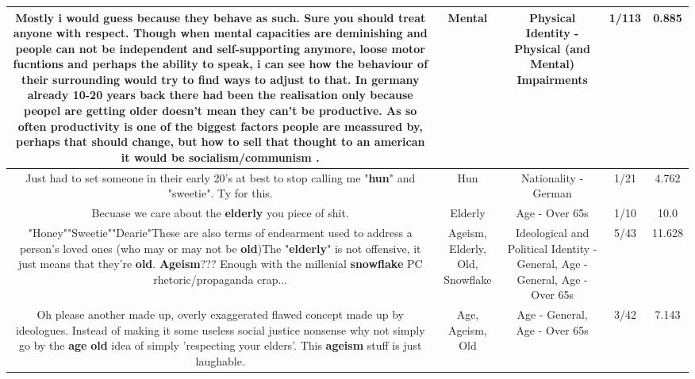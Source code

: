 \documentclass[11pt]{article}
\newlength\mylength
\begin{document}
\begin{center}
\begin{longtable}{|C{.65\mylength}|C{.30\mylength}|C{.12\mylength}|C{.12\mylength}|C{.12\mylength}|}
  \small Mostly i would guess because they behave as such. Sure you should treat anyone with respect. Though when \textbf{mental} capacities are deminishing and people can not be independent and self-supporting anymore, loose motor fucntions and perhaps the ability to speak, i can see how the behaviour of their surrounding would try to find ways to adjust to that. In germany already 10-20 years back there had been the realisation only because peopel are getting older doesn't mean they can't be productive. As so often productivity is one of the biggest factors people are meassured by, perhaps that should change, but how to sell that thought to an american it would be socialism/communism   .\normalsize   & Mental & Physical Identity - Physical (and Mental) Impairments & 1/113 & 0.885 \\  \hline
  \small Just had to set someone in their early 20's at best to stop calling me "\textbf{hun}" and "sweetie". Ty for this.\normalsize   & Hun & Nationality - German & 1/21 & 4.762 \\  \hline
  \small Becuase we care about the \textbf{elderly} you piece of shit.\normalsize   & Elderly & Age - Over 65s & 1/10 & 10.0 \\  \hline
  \small "Honey""Sweetie""Dearie"These are also terms of endearment used to address a person's loved ones (who may or may not be \textbf{old})The "\textbf{elderly}" is not offensive, it just means that they're \textbf{old}. \textbf{Ageism}??? Enough with the millenial \textbf{snowflake} PC rhetoric/propaganda crap...\normalsize   & Ageism, Elderly, Old, Snowflake &  Ideological and Political Identity - General, Age - General, Age - Over 65s & 5/43 & 11.628 \\  \hline
  \small Oh please another made up, overly exaggerated flawed concept made up by ideologues. Instead of making it some useless social justice nonsense why not simply go by the \textbf{age} \textbf{old} idea of simply 'respecting your elders'. This \textbf{ageism} stuff is just laughable.\normalsize   & Age, Ageism, Old & Age - General, Age - Over 65s & 3/42 & 7.143 \\  \hline

\end{longtable}
\end{center}
\end{document}
